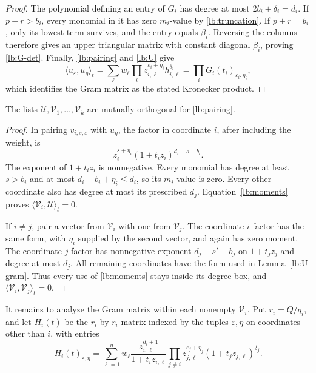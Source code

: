 \begin{proof}
The polynomial defining an entry of \(G_i\) has degree at most
\(2b_i+\delta_i=d_i\).  If \(p+r>b_i\), every monomial in it has
zero \(m_i\)-value by \eqref{lb:truncation}.  If \(p+r=b_i\), only its
lowest term survives, and the entry equals \(\beta_i\).  Reversing the
columns therefore gives an upper triangular matrix with constant
diagonal \(\beta_i\), proving \eqref{lb:G-det}.  Finally,
\eqref{lb:pairing} and \eqref{lb:U} give
\[
  \langle u_\varepsilon,u_\eta\rangle_t
   =\sum_\ell w_\ell\prod_i
      z_{i,\ell}^{\varepsilon_i+\eta_i}h_{i,\ell}^{\delta_i}
   =\prod_iG_i(t_i)_{\varepsilon_i,\eta_i},
\]
which identifies the Gram matrix as the stated Kronecker product.
\end{proof}

\begin{lemma}
\label{lb:orthogonality}
The lists \(\mathcal U,\mathcal V_1,\ldots,\mathcal V_k\) are mutually
orthogonal for \eqref{lb:pairing}.
\end{lemma}

\begin{proof}
In pairing \(v_{i,s,\varepsilon}\) with \(u_\eta\), the factor in
coordinate \(i\), after including the weight, is
\[
   z_i^{s+\eta_i}(1+t_i z_i)^{d_i-s-b_i}.
\]
The exponent of \(1+t_i z_i\) is nonnegative.  Every monomial has
degree at least \(s>b_i\) and at most
\(d_i-b_i+\eta_i\leq d_i\), so its \(m_i\)-value is zero.  Every
other coordinate also has degree at most its prescribed \(d_j\).
Equation~\eqref{lb:moments} proves
\(\langle\mathcal V_i,\mathcal U\rangle_t=0\).

If \(i\neq j\), pair a vector from \(\mathcal V_i\) with one from
\(\mathcal V_j\).  The coordinate-\(i\) factor has the same form,
with \(\eta_i\) supplied by the second vector, and again has zero
moment.  The coordinate-\(j\) factor has nonnegative exponent
\(d_j-s'-b_j\) on \(1+t_jz_j\) and degree at most \(d_j\).
All remaining coordinates have the form used in
Lemma~\ref{lb:U-gram}.  Thus every use of \eqref{lb:moments} stays
inside its degree box, and
\(\langle\mathcal V_i,\mathcal V_j\rangle_t=0\).
\end{proof}

It remains to analyze the Gram matrix within each nonempty
\(\mathcal V_i\).  Put \(r_i=Q/q_i\), and let \(H_i(t)\) be the
\(r_i\)-by-\(r_i\) matrix indexed by the tuples
\(\varepsilon,\eta\) on coordinates other than \(i\), with entries
\begin{equation}
  H_i(t)_{\varepsilon,\eta}
    =\sum_{\ell=1}^{n}w_\ell
       \frac{z_{i,\ell}^{d_i+1}}{1+t_i z_{i,\ell}}
       \prod_{j\neq i}
          z_{j,\ell}^{\varepsilon_j+\eta_j}
          (1+t_jz_{j,\ell})^{\delta_j}.
  \label{lb:H}
\end{equation}

